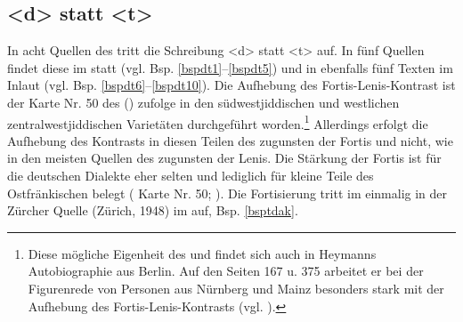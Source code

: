    \subsection{ <d> statt <t>}\label{td}
In acht Quellen des  tritt die Schreibung <d> statt <t> auf. In fünf Quellen findet diese  im  statt (vgl. Bsp. \ref{bspdt1}–\ref{bspdt5}) und in ebenfalls fünf Texten im Inlaut (vgl. Bsp. \ref{bspdt6}–\ref{bspdt10}). Die Aufhebung des Fortis-Lenis-Kontrast ist der Karte Nr. 50 des  (\citeyear[99]{Herzog1992}) zufolge in den südwestjiddischen und westlichen zentralwestjiddischen Varietäten durchgeführt worden.\footnote{Diese mögliche Eigenheit des  und  findet sich auch in Heymanns Autobiographie aus Berlin. Auf den Seiten 167 u. 375 arbeitet er bei der Figurenrede von Personen aus Nürnberg und Mainz besonders stark mit der Aufhebung des Fortis-Lenis-Kontrasts (vgl. \cite[33f]{Schaefer2010}).} Allerdings erfolgt die Aufhebung des Kontrasts in diesen Teilen des  zugunsten der Fortis und nicht, wie in den meisten Quellen des  zugunsten der Lenis. Die Stärkung der Fortis ist für die deutschen Dialekte eher selten und lediglich für kleine Teile des Ostfränkischen belegt ( Karte Nr. 50; \cite[63]{Fink1930}). Die Fortisierung tritt im  einmalig in der Zürcher Quelle  (Zürich, 1948) im  auf, Bsp. \ref{bsptdak}.\\

 
